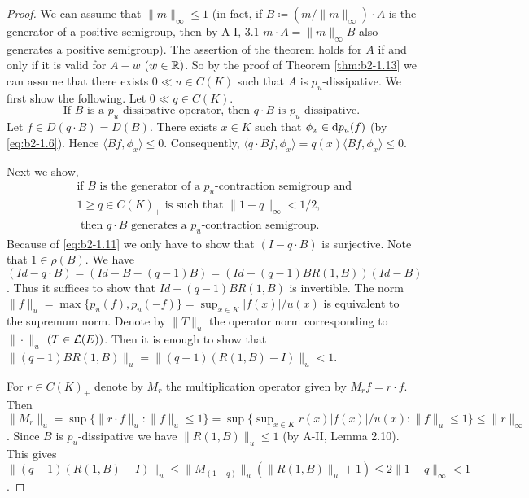 \begin{proof}
We can assume that $\|m\|_{\infty} \leq 1$ (in fact, if $B \coloneqq (m/\|m\|_{\infty}) \cdot A$ is the generator of a positive semigroup, then by A-I, 3.1 $m \cdot A = \|m\|_{\infty}B$ also generates a positive semigroup).
The assertion of the theorem holds for $A$ if and only if it is valid for $A - w$ $(w \in \mathbb{R})$.
So by the proof of Theorem \ref{thm:b2-1.13} we can assume that there exists $0 \ll u \in C(K)$ such that $A$ is $p_{u}$-dissipative.
We first show the following. Let $0 \ll q \in C(K)$.
\begin{equation}\label{eq:b2-1.11}
\text{If } B \text{ is a } p_{u}\text{-dissipative operator, then } q \cdot B \text{ is } p_{u}\text{-dissipative.}
\end{equation}
Let $f \in D(q \cdot B) = D(B)$.
There exists $x \in K$ such that $\phi_{x} \in \mathop{}\!\mathrm{d}{p}_{u}(f)$ (by \eqref{eq:b2-1.6}). 
Hence $\langle Bf,\phi_{x} \rangle \leq 0$.
Consequently, $\langle q \cdot Bf,\phi_{x} \rangle = q(x)\langle Bf,\phi_{x} \rangle \leq 0$.

Next we show,
\begin{equation}  \label{eq:b2-1.12}
\begin{aligned}
&\text{if } B \text{ is the generator of a } p_{u}\text{-contraction semigroup and } \\
&1 \geq q \in C(K)_{+} \text{ is such that } \|1 - q\|_{\infty} < 1/2,  \\
&\text{ then } q \cdot B \text{ generates a } p_{u}\text{-contraction semigroup.}
\end{aligned}
\end{equation}
Because of \eqref{eq:b2-1.11} we only have to show that $(I - q \cdot B)$ is surjective. 
Note that $1 \in \rho(B)$.
We have $(Id - q \cdot B) = (Id - B - (q-1)B) = (Id - (q-1)BR(1,B))(Id - B)$.
Thus it suffices to show that $Id - (q-1)BR(1,B)$ is invertible.
The norm $\|f\|_{u} = \max\{p_{u}(f), p_{u}(-f)\} = \sup_{x \in K} |f(x)|/u(x)$ is equivalent to the supremum norm.
Denote by $\|T\|_{u}$ the operator norm corresponding to $\|\cdot\|_{u}$ $(T \in \mathcal{L}(E))$.
Then it is enough to show that $\|(q-1)BR(1,B)\|_{u} = \|(q-1)(R(1,B) - I)\|_{u} < 1$.

For $r \in C(K)_{+}$ denote by $M_{r}$ the multiplication operator given by $M_{r}f = r \cdot f$.
Then $\|M_{r}\|_{u} = \sup\{\|r \cdot f\|_{u} : \|f\|_{u} \leq 1\} = \sup\{\sup_{x \in K} r(x)|f(x)|/u(x) : \|f\|_{u} \leq 1\} \leq \|r\|_{\infty}$.
Since $B$ is $p_{u}$-dissipative we have $\|R(1,B)\|_{u} \leq 1$ (by A-II, Lemma 2.10).
This gives $\|(q-1)(R(1,B) - I)\|_{u} \leq \|M_{(1-q)}\|_{u}(\|R(1,B)\|_{u} + 1) \leq 2\|1 - q\|_{\infty} < 1$.


\end{proof}
